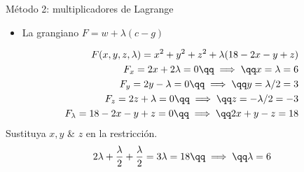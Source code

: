 \begin{enumerate}
\begin{center}
           Método 2: multiplicadores de Lagrange
           \begin{itemize}
               \item La grangiano $\displaystyle F = w + \lambda(c-g)$ 
           \end{itemize}
           \begin{align*}
                F(x,y,z,\lambda)=x^2+y^2+z^2+\lambda(18-2x-y+z) \\ 
                F_x = 2x+2\lambda = 0 \qq \implies \qq x = \lambda =6\\ 
                F_y = 2y-\lambda = 0 \qq \implies \qq y=\lambda/2 =3\\ 
                F_z=2z+\lambda = 0 \qq \implies \qq z = -\lambda/2 = -3 \\ 
                F_\lambda = 18-2x-y+z=0 \qq \implies \qq 2x+y-z = 18 \\ 
           \end{align*}
           Sustituya $\displaystyle x,y$ \& $\displaystyle z$  en la restricción.
           \begin{align*}
               2\lambda+\frac{\lambda }{2} + \frac{\lambda}{2} = 3\lambda = 18 \qq \implies \qq \lambda=6 \\ 
           \end{align*}
        \end{center}
    

\end{enumerate}
